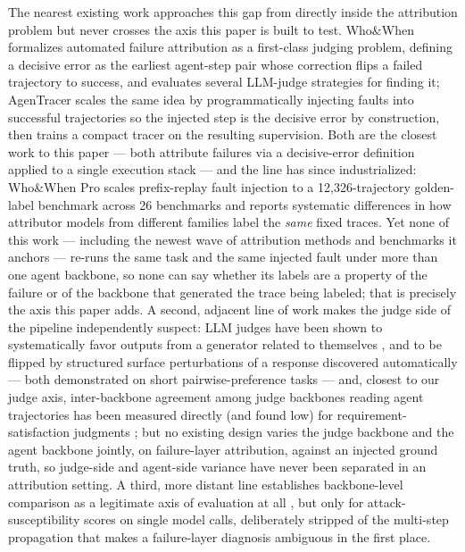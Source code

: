 \documentclass[11pt]{article}
\begin{document}
The nearest existing work approaches this gap from directly inside the attribution problem but never crosses the axis this paper is built to test. Who\&When \citep{WhoWhen2025} formalizes automated failure attribution as a first-class judging problem, defining a decisive error as the earliest agent-step pair whose correction flips a failed trajectory to success, and evaluates several LLM-judge strategies for finding it; AgenTracer \citep{AgenTracer2025} scales the same idea by programmatically injecting faults into successful trajectories so the injected step is the decisive error by construction, then trains a compact tracer on the resulting supervision. Both are the closest work to this paper --- both attribute failures via a decisive-error definition applied to a single execution stack --- and the line has since industrialized: Who\&When Pro \citep{WhoWhenPro2026} scales prefix-replay fault injection to a 12,326-trajectory golden-label benchmark across 26 benchmarks and reports systematic differences in how attributor models from different families label the \emph{same} fixed traces. Yet none of this work --- including the newest wave of attribution methods and benchmarks it anchors --- re-runs the same task and the same injected fault under more than one agent backbone, so none can say whether its labels are a property of the failure or of the backbone that generated the trace being labeled; that is precisely the axis this paper adds. A second, adjacent line of work makes the judge side of the pipeline independently suspect: LLM judges have been shown to systematically favor outputs from a generator related to themselves \citep{PreferenceLeakage2025}, and to be flipped by structured surface perturbations of a response discovered automatically \citep{BiasScope2025} --- both demonstrated on short pairwise-preference tasks --- and, closest to our judge axis, inter-backbone agreement among judge backbones reading agent trajectories has been measured directly (and found low) for requirement-satisfaction judgments \citep{AaaJBackbone2026}; but no existing design varies the judge backbone and the agent backbone jointly, on failure-layer attribution, against an injected ground truth, so judge-side and agent-side variance have never been separated in an attribution setting. A third, more distant line establishes backbone-level comparison as a legitimate axis of evaluation at all \citep{BreakingBackbones2025}, but only for attack-susceptibility scores on single model calls, deliberately stripped of the multi-step propagation that makes a failure-layer diagnosis ambiguous in the first place.
\end{document}
